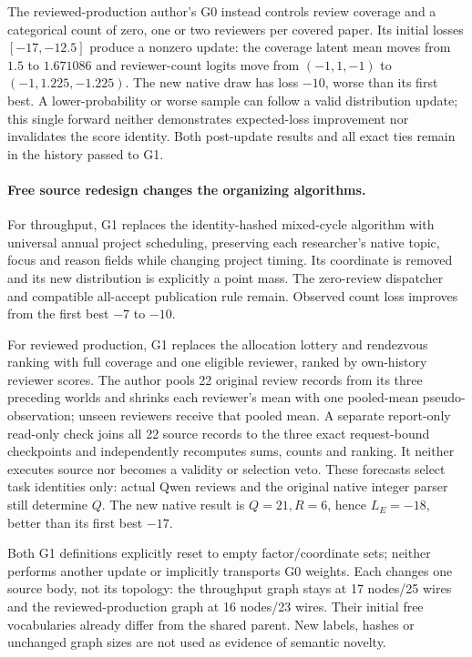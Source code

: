 The reviewed-production author's G0 instead controls review coverage and a
categorical count of zero, one or two reviewers per covered paper. Its
initial losses $[-17,-12.5]$ produce a nonzero update: the coverage latent
mean moves from $1.5$ to $1.671086$ and reviewer-count logits move from
$(-1,1,-1)$ to $(-1,1.225,-1.225)$. The new native draw has loss $-10$, worse
than its first best. A lower-probability or worse sample can follow a valid
distribution update; this single forward neither demonstrates expected-loss
improvement nor invalidates the score identity. Both post-update results and
all exact ties remain in the history passed to G1.

\paragraph{Free source redesign changes the organizing algorithms.}
For throughput, G1 replaces the identity-hashed mixed-cycle algorithm with
universal annual project scheduling, preserving each researcher's native
topic, focus and reason fields while changing project timing. Its coordinate
is removed and its new distribution is explicitly a point mass. The
zero-review dispatcher and compatible all-accept publication rule remain.
Observed count loss improves from the first best $-7$ to $-10$.

For reviewed production, G1 replaces the allocation lottery and rendezvous
ranking with full coverage and one eligible reviewer, ranked by own-history
reviewer scores. The author pools 22 original review records from its three
preceding worlds and shrinks each reviewer's mean with one pooled-mean
pseudo-observation; unseen reviewers receive that pooled mean. A separate
report-only read-only check joins all 22 source records to the three exact
request-bound checkpoints and independently recomputes sums, counts and
ranking. It neither executes source nor becomes a validity or selection veto.
These forecasts select task identities only: actual Qwen reviews and the
original native integer parser still determine $Q$. The new native result
is $Q=21,R=6$, hence $L_E=-18$, better than its first best $-17$.

Both G1 definitions explicitly reset to empty factor/coordinate sets; neither
performs another update or implicitly transports G0 weights. Each changes one
source body, not its topology: the throughput graph stays at 17 nodes/25 wires
and the reviewed-production graph at 16 nodes/23 wires. Their initial free
vocabularies already differ from the shared parent. New labels, hashes or
unchanged graph sizes are not used as evidence of semantic novelty.

